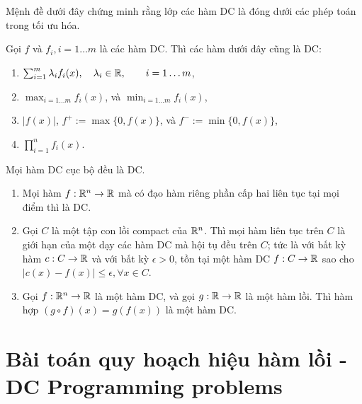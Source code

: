 \documentclass[a4paper]{report}
\begin{document}
    Mệnh đề dưới đây chứng minh rằng lớp các hàm DC là đóng dưới các phép toán trong tối ưu hóa. 

    \begin{proposition}
        \label{prop:closed_operations_dc}
        Gọi $f$ và $f_i, i = 1\dots m$ là các hàm DC. Thì các hàm dưới đây cũng là DC:
        \begin{enumerate}[label=(\roman*)]
            \item $\sum_{i=1}^m\lambda_if_i(x), \quad\lambda_i \in \mathbb{R},\quad\quad i = 1\dots m$,
            \item $\max_{i = 1\dots m}f_i(x)$, và $\min_{i = 1\dots m}f_i(x)$,
            \item $|f(x)|$, $f^{+} := \max\{0, f(x)\}$, và $f^{-} := \min\{0, f(x)\}$,
            \item $\prod_{i=1}^nf_i(x)$.
        \end{enumerate}
    \end{proposition}

    \begin{proposition}
        \label{prop:locally_dc}
        Mọi hàm DC cục bộ đều là DC.
    \end{proposition}

    \begin{proposition}
        \label{prop:dc_consequences}
        \begin{enumerate}[label=(\roman*)]
            \item Mọi hàm $f: \mathbb{R}^n \rightarrow \mathbb{R}$ mà có đạo hàm riêng phần cấp hai liên tục tại mọi điểm thì là DC.
            \item Gọi $C$ là một tập con lồi compact của $\mathbb{R}^n$. Thì mọi hàm liên tục trên $C$ là giới hạn của một dạy các hàm DC mà hội tụ đều trên $C$; tức là với bất kỳ hàm $c: C \rightarrow \mathbb{R}$ và với bất kỳ $\epsilon > 0$, tồn tại một hàm DC $f: C \rightarrow \mathbb{R}$ sao cho $|c(x) - f(x)| \leq \epsilon, \forall x \in C$.
            \item Gọi $f: \mathbb{R}^n \rightarrow \mathbb{R}$ là một hàm DC, và gọi $g: \mathbb{R} \rightarrow \mathbb{R}$ là một hàm lồi. Thì hàm hợp $(g \circ f)(x) = g(f(x))$ là một hàm DC. 
        \end{enumerate}
    \end{proposition}

    \section{Bài toán quy hoạch hiệu hàm lồi - DC Programming problems}
    \label{sec:dc_programming}
\end{document}
